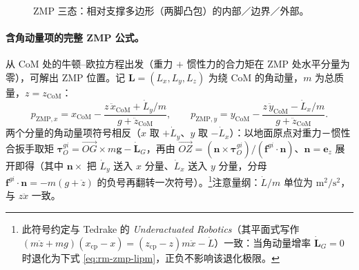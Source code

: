 \begin{figure}[H]
\centering
{}
\caption{ZMP 三态：相对支撑多边形（两脚凸包）的内部／边界／外部。}
\label{fig:rm-zmp}
\end{figure}

\paragraph{含角动量项的完整 ZMP 公式。}
从 CoM 处的牛顿–欧拉方程出发（重力 $+$ 惯性力的合力矩在 ZMP 处水平分量为零），可解出 ZMP 位置。记 $\mathbf{L}=(L_x,L_y,L_z)$ 为绕 CoM 的角动量，$m$ 为总质量，$z=z_{\mathrm{CoM}}$：
\begin{equation}
  p_{\mathrm{ZMP},x}=x_{\mathrm{CoM}}-\frac{z\,\ddot{x}_{\mathrm{CoM}}+\dot{L}_y/m}{g+\ddot{z}_{\mathrm{CoM}}},
  \qquad
  p_{\mathrm{ZMP},y}=y_{\mathrm{CoM}}-\frac{z\,\ddot{y}_{\mathrm{CoM}}-\dot{L}_x/m}{g+\ddot{z}_{\mathrm{CoM}}}.
  \label{eq:rm-zmp-full}
\end{equation}
两个分量的角动量项符号相反（$x$ 取 $+\dot{L}_y$、$y$ 取 $-\dot{L}_x$）：以地面原点对重力－惯性合扳手取矩 $\boldsymbol{\tau}^{gi}_O=\overrightarrow{OG}\times m\mathbf{g}-\dot{\mathbf{L}}_G$，再由 $\overrightarrow{OZ}=(\mathbf{n}\times\boldsymbol{\tau}^{gi}_O)/(\mathbf{f}^{gi}\!\cdot\!\mathbf{n})$、$\mathbf{n}=\mathbf{e}_z$ 展开即得（其中 $\mathbf{n}\times$ 把 $\dot{L}_y$ 送入 $x$ 分量、$\dot{L}_x$ 送入 $y$ 分量，分母 $\mathbf{f}^{gi}\!\cdot\!\mathbf{n}=-m(g+\ddot{z})$ 的负号再翻转一次符号）\cite{vukobratovic2004zero}。\footnote{此符号约定与 Tedrake 的 \emph{Underactuated Robotics}（其平面式写作 $(m\ddot z+mg)(x_{\mathrm{cp}}-x)=(z_{\mathrm{cp}}-z)m\ddot x-\dot{L}$）一致：当角动量增率 $\dot{\mathbf{L}}_G=0$ 时退化为下式 \cref{eq:rm-zmp-lipm}，正负不影响该退化极限。}注意量纲：$\dot{L}/m$ 单位为 $\mathrm{m^2/s^2}$，与 $z\ddot{x}$ 一致。

